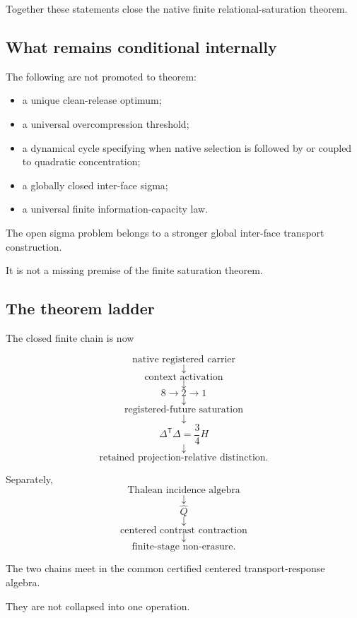 Together these statements close the native finite
relational-saturation theorem.

\subsection{What remains conditional internally}

The following are not promoted to theorem:

\begin{itemize}

\item a unique clean-release optimum;

\item a universal overcompression threshold;

\item a dynamical cycle specifying when native selection is followed
by or coupled to quadratic concentration;

\item a globally closed inter-face sigma;

\item a universal finite information-capacity law.

\end{itemize}

The open sigma problem belongs to a stronger global inter-face
transport construction.

It is not a missing premise of the finite saturation theorem.

\subsection{The theorem ladder}

The closed finite chain is now

\[
\text{native registered carrier}
\]
\[
\downarrow
\]
\[
\text{context activation}
\]
\[
\downarrow
\]
\[
8\to2\to1
\]
\[
\downarrow
\]
\[
\text{registered-future saturation}
\]
\[
\downarrow
\]
\[
\Delta^{\mathsf T}\Delta=\frac34H
\]
\[
\downarrow
\]
\[
\text{retained projection-relative distinction}.
\]

Separately,
\[
\text{Thalean incidence algebra}
\]
\[
\downarrow
\]
\[
\widehat Q
\]
\[
\downarrow
\]
\[
\text{centered contrast contraction}
\]
\[
\downarrow
\]
\[
\text{finite-stage non-erasure}.
\]

The two chains meet in the common certified centered
transport-response algebra.

They are not collapsed into one operation.

